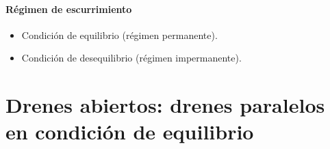 \paragraph{Régimen de escurrimiento}
\begin{itemize}
  \item Condición de equilibrio (régimen permanente).
  \item Condición de desequilibrio (régimen impermanente).
\end{itemize}

\newcommand{\drenesabiertos}[1]{%
\begin{tikzpicture}[font=\small,scale=0.9]
  \def\d{#1}
  \fill[pattern=crosshatch,pattern color=gray!60] (-0.5,-\d-0.25) rectangle (8.5,-\d);
  \draw (-0.5,-\d) -- (8.5,-\d);
  \draw[thick] (-0.5,3) -- (0.6,3) -- (0.6,0) -- (1.0,0) -- (1.0,3) -- (7.0,3) -- (7.0,0) -- (7.4,0) -- (7.4,3) -- (8.5,3);
  \fill[agua!60] (0.6,0) rectangle (1.0,1.0); \fill[agua!60] (7.0,0) rectangle (7.4,1.0);
  \fill[rojo,opacity=0.15,draw=rojo] (1.0,0) rectangle (3.3,3);
  \node[rojo] at (1.6,2.6) {\large$V_c$};
  \draw[azulusm,thick] (1.0,1.0) .. controls (1.3,2.0) and (2.5,2.3) .. (4.0,2.3) .. controls (5.5,2.3) and (6.7,2.0) .. (7.0,1.0);
  \pic at (0.8,1.02) {nivelagua}; \pic at (7.2,1.02) {nivelagua};
  \foreach \x in {-0.3,0.1,1.6,2.1,2.6,3.1,3.6,4.1,4.6,5.1,5.6,6.1,7.8,8.2}
    \draw[->,azulusm,thick] (\x,4.0) -- (\x,3.1);
  \node at (0.0,4.3) {$f$}; \node at (3.8,4.3) {$f$}; \node at (8.0,4.3) {$f$};
  \draw[cota] (0.2,0) -- (0.2,1.0) node[midway,left]{$h_0$};
  \draw[cota] (7.8,0) -- (7.8,1.0) node[midway,right]{$h_0$};
  \draw[cota] (4.0,0) -- (4.0,2.3) node[midway,right]{$H$};
  \draw[cota] (1.3,0) -- (1.3,1.45) node[midway,right]{$h$};
  \draw[->] (1.0,0.15) -- (2.0,0.15) node[midway,above]{$x$};
  \draw[flecha,azulusm] (2.4,1.1) -- (1.7,1.1) node[pos=0,right]{$q$};
  \draw[flecha,azulusm] (5.8,1.1) -- (6.5,1.1) node[pos=0,left]{$q$};
  \draw[cota] (0.8,-\d-0.6) -- (7.2,-\d-0.6) node[midway,below]{$D$};
  \ifdim\d pt>0pt \draw[cota] (7.6,-\d) -- (7.6,0) node[midway,right]{$d$};\fi
\end{tikzpicture}}

\section{Drenes abiertos: drenes paralelos en condición de equilibrio}

